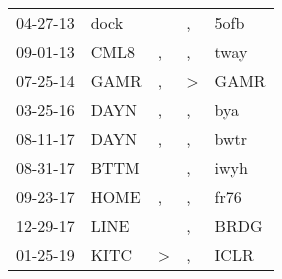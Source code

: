 \begin{supertabular}{p{0.07\textwidth}p{0.06\textwidth}p{0.02\textwidth}p{0.02\textwidth}p{0.06\textwidth}}
 04-27-13\textsuperscript{} &  dock\textsuperscript{} &               &             , &           5ofb\textsuperscript{} \\
 09-01-13\textsuperscript{} &  CML8\textsuperscript{} &             , &             , &           tway\textsuperscript{} \\
 07-25-14\textsuperscript{} &  GAMR\textsuperscript{} &             , &  \textgreater &           GAMR\textsuperscript{} \\
 03-25-16\textsuperscript{} &  DAYN\textsuperscript{} &             , &             , &            bya\textsuperscript{} \\
 08-11-17\textsuperscript{} &  DAYN\textsuperscript{} &             , &             , &           bwtr\textsuperscript{} \\
 08-31-17\textsuperscript{} &  BTTM\textsuperscript{} &               &             , &           iwyh\textsuperscript{} \\
 09-23-17\textsuperscript{} &  HOME\textsuperscript{} &             , &             , &           fr76\textsuperscript{} \\
 12-29-17\textsuperscript{} &  LINE\textsuperscript{} &               &             , &           BRDG\textsuperscript{} \\
 01-25-19\textsuperscript{} &  KITC\textsuperscript{} &  \textgreater &             , &           ICLR\textsuperscript{} \\
\end{supertabular}
